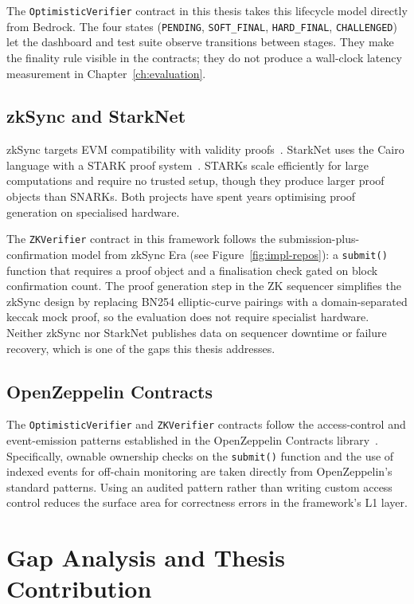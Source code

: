 The \texttt{OptimisticVerifier} contract in this thesis takes this lifecycle model directly from Bedrock. The four states (\texttt{PENDING}, \texttt{SOFT\_FINAL}, \texttt{HARD\_FINAL}, \texttt{CHALLENGED}) let the dashboard and test suite observe transitions between stages. They make the finality rule visible in the contracts; they do not produce a wall-clock latency measurement in Chapter~\ref{ch:evaluation}.

\subsection{zkSync and StarkNet}
\label{sec:zk-production}

zkSync targets EVM compatibility with validity proofs~\cite{zksync-paper}. StarkNet uses the Cairo language with a STARK proof system~\cite{starknet2024,cairo2021}. STARKs scale efficiently for large computations and require no trusted setup, though they produce larger proof objects than SNARKs. Both projects have spent years optimising proof generation on specialised hardware.

The \texttt{ZKVerifier} contract in this framework follows the submission-plus-confirmation model from zkSync Era (see Figure~\ref{fig:impl-repos}): a \texttt{submit()} function that requires a proof object and a finalisation check gated on block confirmation count. The proof generation step in the ZK sequencer simplifies the zkSync design by replacing BN254 elliptic-curve pairings with a domain-separated keccak mock proof, so the evaluation does not require specialist hardware. Neither zkSync nor StarkNet publishes data on sequencer downtime or failure recovery, which is one of the gaps this thesis addresses.

\subsection{OpenZeppelin Contracts}

The \texttt{OptimisticVerifier} and \texttt{ZKVerifier} contracts follow the access-control and event-emission patterns established in the OpenZeppelin Contracts library~\cite{openzeppelin2024}. Specifically, ownable ownership checks on the \texttt{submit()} function and the use of indexed events for off-chain monitoring are taken directly from OpenZeppelin's standard patterns. Using an audited pattern rather than writing custom access control reduces the surface area for correctness errors in the framework's L1 layer.

\section{Gap Analysis and Thesis Contribution}

